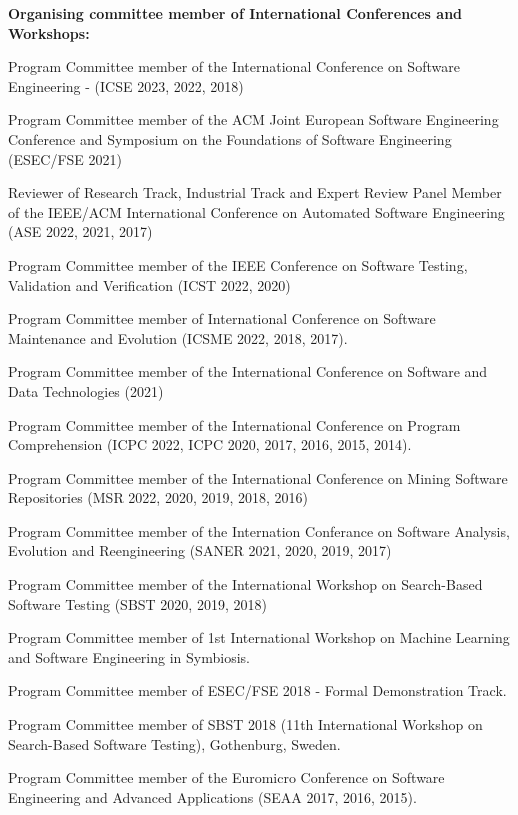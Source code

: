 \documentclass[10pt]{article}
\newcommand\on[1]{\nbc{ON}{#1}{red}} %
\begin{document}
\textbf{Organising committee member of International Conferences and Workshops:}
\begin{innerlist}
\item Program Committee member of the International Conference on Software Engineering - (ICSE 2023, 2022, 2018)
\item Program Committee member of the  ACM Joint European Software Engineering Conference and Symposium on the Foundations of Software Engineering (ESEC/FSE 2021)
\item Reviewer of Research Track, Industrial Track and Expert Review Panel Member of the IEEE/ACM International Conference on Automated Software Engineering (ASE 2022, 2021, 2017)
\item Program Committee member of  the IEEE Conference on Software Testing, Validation and Verification (ICST 2022, 2020) 
\item Program Committee member of  International Conference on Software Maintenance and Evolution (ICSME 2022, 2018, 2017). 
\item Program Committee member of the  International Conference on Software and Data Technologies (2021)
\item Program Committee member of the International Conference on Program Comprehension (ICPC 2022, ICPC 2020, 2017, 2016, 2015, 2014).
\item Program Committee member of  the International Conference on Mining Software Repositories (MSR 2022, 2020, 2019, 2018, 2016)  
\item Program Committee member of  the Internation Conferance on Software Analysis, Evolution and Reengineering (SANER 2021, 2020, 2019, 2017)
\item Program Committee member of  the  International Workshop on Search-Based Software Testing (SBST 2020, 2019, 2018)   
\item Program Committee member of 1st International Workshop on Machine Learning and Software Engineering in Symbiosis.
\item Program Committee member of  ESEC/FSE 2018 - Formal Demonstration Track.
\item Program Committee member of SBST 2018 (11th International Workshop on Search-Based Software Testing), Gothenburg, Sweden.
\item Program Committee member of the Euromicro Conference on Software Engineering and Advanced Applications (SEAA 2017, 2016, 2015).

\end{innerlist}
\end{document}
